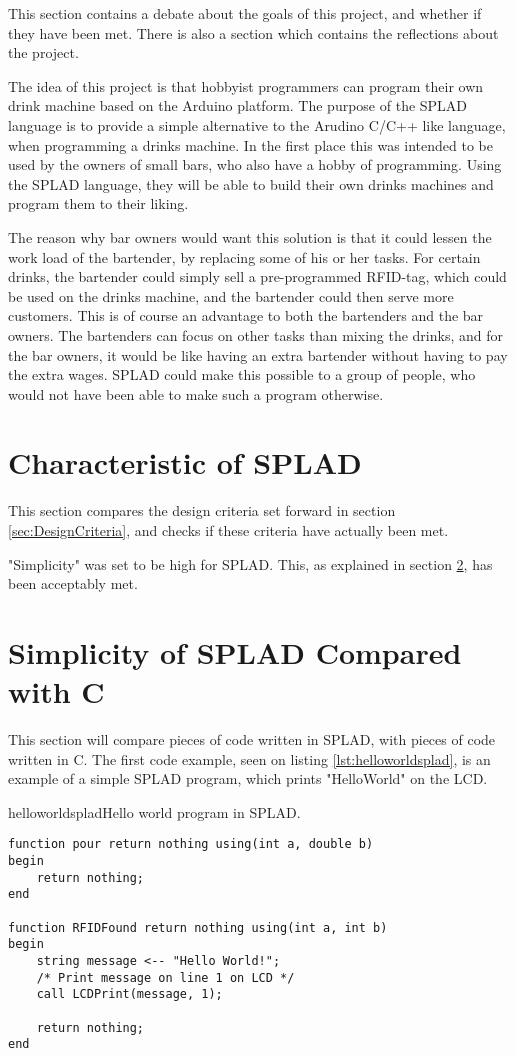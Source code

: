 This section contains a debate about the goals of this project, and whether if they have been met. There is also a section which contains the reflections about the project.

The idea of this project is that hobbyist programmers can program their own drink machine based on the Arduino platform. The purpose of the SPLAD language is to provide a simple alternative to the Arudino C/C++ like language, when programming a drinks machine. In the first place this was intended to be used by the owners of small bars, who also have a hobby of programming. Using the SPLAD language, they will be able to build their own drinks machines and program them to their liking.

The reason why bar owners would want this solution is that it could lessen the work load of the bartender, by replacing some of his or her tasks. For certain drinks, the bartender could simply sell a pre-programmed RFID-tag, which could be used on the drinks machine, and the bartender could then serve more customers. This is of course an advantage to both the bartenders and the bar owners. The bartenders can focus on other tasks than mixing the drinks, and for the bar owners, it would be like having an extra bartender without having to pay the extra wages. SPLAD could make this possible to a group of people, who would not have been able to make such a program otherwise.

\section{Characteristic of SPLAD}
This section compares the design criteria set forward in section \ref{sec:DesignCriteria}, and checks if these criteria have actually been met.

"Simplicity" was set to be high for SPLAD. This, as explained in section \ref{sec:simplespladc}, has been acceptably met. 

\section{Simplicity of SPLAD Compared with C}
\label{sec:simplespladc}
This section will compare pieces of code written in SPLAD, with pieces of code written in C. The first code example, seen on listing \ref{lst:helloworldsplad}, is an example of a simple SPLAD program, which prints "HelloWorld" on the LCD.

\begin{code}{helloworldsplad}{Hello world program in SPLAD.}
\begin{lstlisting}
function pour return nothing using(int a, double b)
begin
	return nothing;
end

function RFIDFound return nothing using(int a, int b)
begin
	string message <-- "Hello World!";
	/* Print message on line 1 on LCD */
	call LCDPrint(message, 1);

	return nothing;
end
\end{lstlisting}
\end{code}

